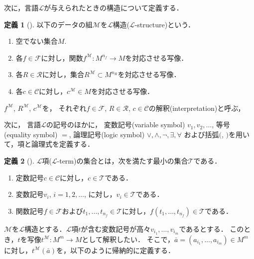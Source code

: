 \documentclass[uplatex, dvipdfmx]{jsarticle}
\numberwithin{equation}{section}
\newcommand{\map}[3]{{#1}\colon{#2}\rightarrow{#3}}
\theoremstyle{definition}
\newtheorem{definition}{定義}[section]
\begin{document}
次に，言語$\mathcal{L}$が与えられたときの構造について定義する．

\begin{definition}[{\cite[Definition 1.1.2]{MR1924282}}]
     以下のデータの組$\mathcal{M}$を$\mathcal{L}$構造($\mathcal{L}$-structure)という．
     \begin{enumerate}
          \item 空でない集合$M$. 
          \item 各$f \in \mathcal{F}$に対し，関数$\map{f^\mathcal{M}}{M^{n_f}}{M}$を対応させる写像．
          \item 各$R \in \mathcal{R}$に対し，集合$R^\mathcal{M} \subset M^{n_R}$を対応させる写像．
          \item 各$c \in \mathcal{C}$に対し，$c^\mathcal{M} \in M$を対応させる写像．
     \end{enumerate}
\end{definition}

$f^\mathcal{M}$, $R^\mathcal{M}$, $c^\mathcal{M}$を，
それぞれ$f \in \mathcal{F}$, $R \in \mathcal{R}$, $c \in \mathcal{C}$の解釈(interpretation)と呼ぶ，

次に，
言語$\mathcal{L}$の記号のほかに，
変数記号(variable symbol) $v_1, v_2, \dots$, 
等号(equality symbol) $=$,
論理記号(logic symbol) $\lor, \land, \lnot, \exists, \forall$
および括弧$($, $)$を用いて，項と論理式を定義する．

\begin{definition}[{\cite[Definition 1.1.4]{MR1924282}}]
     $\mathcal{L}$項($\mathcal{L}$-term)の集合とは，次を満たす最小の集合$\mathcal{T}$である．
     \begin{enumerate}
          \item 定数記号$c \in \mathcal{C}$に対し，$c \in \mathcal{T}$である．
          \item 変数記号$v_i$, $i=1, 2, \dots$, に対し，$v_i \in \mathcal{T}$である．
          \item 関数記号$f \in \mathcal{F}$および$t_1, \dots, t_{n_f} \in \mathcal{T}$に対し，$f(t_1, \dots, t_{n_f}) \in \mathcal{T}$である．
     \end{enumerate}
\end{definition}

$\mathcal{M}$を$\mathcal{L}$構造とする．$\mathcal{L}$項$t$が含む変数記号が高々$v_{i_1}, \dots, v_{i_m}$であるとする．
このとき，$t$を写像$\map{t^\mathcal{M}}{M^m}{M}$として解釈したい．
そこで，$\bar{a} = (a_{i_1}, \dots, a_{i_m}) \in M^m$に対し，$t^\mathcal{M}(\bar{a})$を，以下のように帰納的に定義する．
\end{document}
